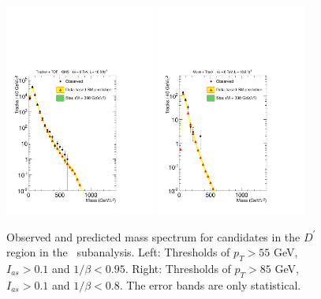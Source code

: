 \begin{figure}
 \begin{center}
  \includegraphics[clip=true, trim=0.0cm 0cm 2.8cm 0cm,width=0.44\textwidth]{figures/tkmu/RescaleNoRatio_Mass_Flip_8TeV_LooseNoSMMC}
  \includegraphics[clip=true, trim=0.0cm 0cm 2.8cm 0cm,width=0.44\textwidth]{figures/tkmu/RescaleNoRatio_Mass_Flip_8TeV_TightNoSMMC}
 \end{center}
 \caption[Observed and predicted mass spectrum for candidates in the \invbeta\ $<$ 1 region in the \tktof\ analysis.]
{Observed and predicted mass spectrum for candidates in the $D^\prime$ region in the \tktof\ subanalysis.
Left: Thresholds of $p_T > 55$ GeV, $I_{as} > 0.1$ and $1/\beta < 0.95$.
Right: Thresholds of $p_T > 85$ GeV, $I_{as} > 0.1$ and $1/\beta < 0.8$.
The error bands are only statistical.}
\label{fig:FlipMassDistribution}
\end{figure}

